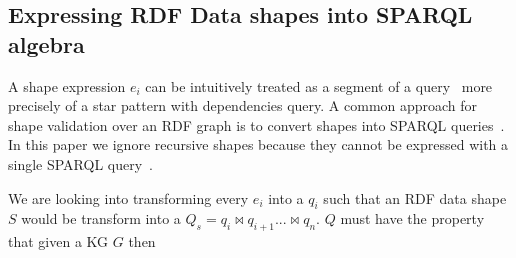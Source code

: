 \iffalse
\begin{algorithm}
   \caption{Dynamic reachability generation algorithm with a shape index}\label{alg:shapeIndex}
   \begin{algorithmic}
      \REQUIRE Given a Shape Index $(M, D)$ and a query $Q$
      \ENSURE $IRI_d$ a set of IRI leading to query relevant sources and $IRI_p$ a set of IRI leading to non query relevant sources

      \STATE Divide the $Q$ into a set of star pattern with dependencies $Q_{sd}$ such that $Q = q_{sd,1}  \bowtie q_{sd,2} ... \bowtie q_{sd,n}$ given $n$  $q_{sd,i}$.
      \STATE $IRI_d = \{\}$
      \STATE $ContainedQueries = \{\}$
      \STATE $IRI_p = \{\}$

      \FORALL{$q_{sd} \in Q_{sd}$}
         \FORALL{$(s, iri) \in M$}
            \IF{$q_{sd} \sqsubseteq_l T(s)$}
               \STATE $IRI_d = IRI_d \cup \{iri\}$
               \STATE $ContainedQueries = ContainedQueries \cup \{q_{sd}\}$   
            \ENDIF
         \ENDFOR
      \ENDFOR
      
      

      \IF{$(IRI_0 \in D) = \emptyset$ \OR $Q_{sd} \setminus containedQueries = \emptyset$}
         \STATE $IRI_p = D \setminus IRI_d$
      \ELSE
         \STATE $IRI_m = \{\text{Codomain of }m_i(s)| \forall m_i \in M \}$
         \STATE $IRI_p = IRI_m \setminus IRI_d$
      \ENDIF
   \end{algorithmic}
\end{algorithm}
\fi
\subsection{Expressing RDF Data shapes into SPARQL algebra}\label{sec:shape2SPARQL}

A shape expression $e_i$ can be intuitively treated as a segment of a query~\cite{delva2023} more precisely of a star pattern with dependencies query.
A common approach for shape validation over an RDF graph is to convert shapes into SPARQL queries~\cite{labragayo2017validatingdescribinglinkeddata, Corman2019, spapeExpressionConvert}.
In this paper we ignore recursive shapes because they cannot be expressed with a single SPARQL query~\cite{Corman2019}. 

We are looking into transforming every $e_i$ into a $q_i$ such that an RDF data shape $S$ would be transform into a $Q_s = q_i \bowtie q_{i+1} ... \bowtie q_n$.
$Q$ must have the property that given a KG $G$ then 

